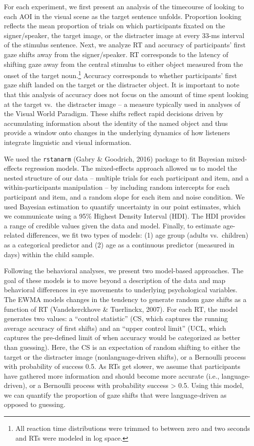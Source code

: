 \documentclass[english,floatsintext,man]{apa6}
\begin{document}
For each experiment, we first present an analysis of the timecourse of
looking to each AOI in the visual scene as the target sentence unfolds.
Proportion looking reflects the mean proportion of trials on which
participants fixated on the signer/speaker, the target image, or the
distracter image at every 33-ms interval of the stimulus sentence. Next,
we analyze RT and accuracy of participants' first gaze shifts away from
the signer/speaker. RT corresponds to the latency of shifting gaze away
from the central stimulus to either object measured from the onset of
the target noun.\footnote{All reaction time distributions were trimmed
  to between zero and two seconds and RTs were modeled in log space.}
Accuracy corresponds to whether participants' first gaze shift landed on
the target or the distracter object. It is important to note that this
analysis of accuracy does not focus on the amount of time spent looking
at the target vs.~the distracter image -- a measure typically used in
analyses of the Visual World Paradigm. These shifts reflect rapid
decisions driven by accumulating information about the identity of the
named object and thus provide a window onto changes in the underlying
dynamics of how listeners integrate linguistic and visual information.

We used the \texttt{rstanarm} (Gabry \& Goodrich, 2016) package to fit
Bayesian mixed-effects regression models. The mixed-effects approach
allowed us to model the nested structure of our data -- multiple trials
for each participant and item, and a within-participants manipulation --
by including random intercepts for each participant and item, and a
random slope for each item and noise condition. We used Bayesian
estimation to quantify uncertainty in our point estimates, which we
communicate using a 95\% Highest Density Interval (HDI). The HDI
provides a range of credible values given the data and model. Finally,
to estimate age-related differences, we fit two types of models: (1) age
group (adults vs.~children) as a categorical predictor and (2) age as a
continuous predictor (measured in days) within the child sample.

Following the behavioral analyses, we present two model-based
approaches. The goal of these models is to move beyond a description of
the data and map behavioral differences in eye movements to underlying
psychological variables. The EWMA models changes in the tendency to
generate random gaze shifts as a function of RT (Vandekerckhove \&
Tuerlinckx, 2007). For each RT, the model generates two values: a
\enquote{control statistic} (CS, which captures the running average
accuracy of first shifts) and an \enquote{upper control limit} (UCL,
which captures the pre-defined limit of when accuracy would be
categorized as better than guessing). Here, the CS is an expectation of
random shifting to either the target or the distracter image
(nonlanguage-driven shifts), or a Bernoulli process with probability of
success 0.5. As RTs get slower, we assume that participants have
gathered more information and should become more accurate (i.e.,
language-driven), or a Bernoulli process with probability success
\textgreater{} 0.5. Using this model, we can quantify the proportion of
gaze shifts that were language-driven as opposed to guessing.
\end{document}
